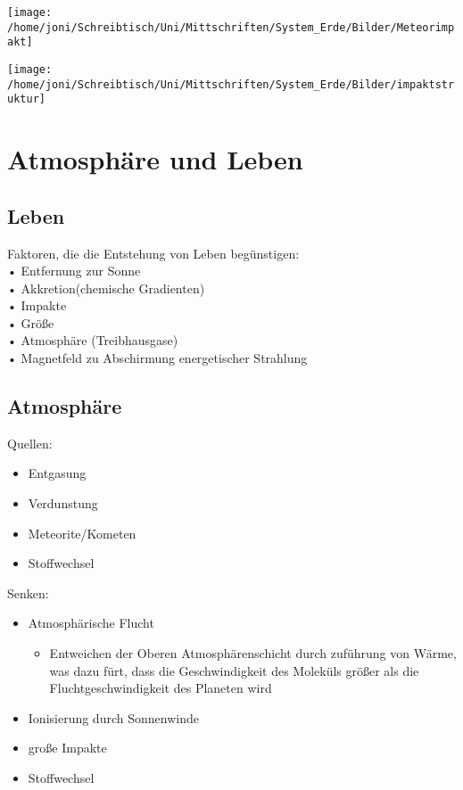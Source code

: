 \documentclass[a4,12pt]{scrreprt}
\begin{document}
\texttt{[image: /home/joni/Schreibtisch/Uni/Mittschriften/System\_Erde/Bilder/Meteorimpakt]}

\texttt{[image: /home/joni/Schreibtisch/Uni/Mittschriften/System\_Erde/Bilder/impaktstruktur]}

\section{Atmosphäre und Leben} \label{Atmosphäre und Meteoriten}

\subsection{Leben} \label{Leben}
Faktoren, die die Entstehung von Leben begünstigen:\\
• Entfernung zur Sonne\\
• Akkretion(chemische Gradienten)\\
• Impakte\\
• Größe\\
• Atmosphäre (Treibhausgase)\\
• Magnetfeld zu Abschirmung energetischer Strahlung\\

\subsection{Atmosphäre}

Quellen:
\begin{itemize}
\item Entgasung
\item Verdunstung
\item Meteorite/Kometen
\item Stoffwechsel\\
\end{itemize}
Senken:
\begin{itemize}
\item Atmosphärische Flucht
\begin{itemize}
\item Entweichen der Oberen Atmosphärenschicht durch zuführung von Wärme, was dazu fürt, dass die Geschwindigkeit des Moleküls größer als die Fluchtgeschwindigkeit des Planeten wird
\end{itemize}
\item Ionisierung durch Sonnenwinde
\item große Impakte
\item Stoffwechsel
\end{itemize}
\end{document}
